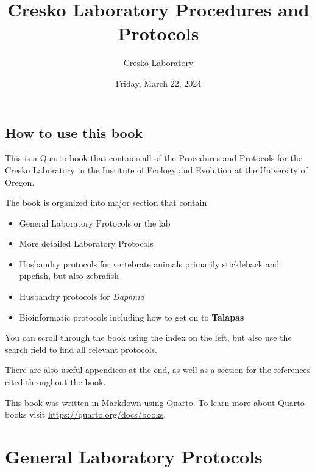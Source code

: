 \documentclass[
  letterpaper,
  DIV=11,
  numbers=noendperiod]{scrreprt}
\title{Cresko Laboratory Procedures and Protocols}
\author{Cresko Laboratory}
\date{Friday, March 22, 2024}
\renewcommand*\contentsname{Table of contents}
\newcommand\contentsname{Table of contents}
\begin{document}
\maketitle
\ifdefined\Shaded\renewenvironment{Shaded}{\begin{tcolorbox}[frame hidden, breakable, boxrule=0pt, interior hidden, sharp corners, enhanced, borderline west={3pt}{0pt}{shadecolor}]}{\end{tcolorbox}}\fi

\renewcommand*\contentsname{Table of contents}
{
\hypersetup{linkcolor=}
\setcounter{tocdepth}{2}
\tableofcontents
}

\hypertarget{how-to-use-this-book}{%
\chapter*{How to use this book}\label{how-to-use-this-book}}


This is a Quarto book that contains all of the Procedures and Protocols
for the Cresko Laboratory in the Institute of Ecology and Evolution at
the University of Oregon.

The book is organized into major section that contain

\begin{itemize}
\item
  General Laboratory Protocols or the lab
\item
  More detailed Laboratory Protocols
\item
  Husbandry protocols for vertebrate animals primarily stickleback and
  pipefish, but also zebrafish
\item
  Husbandry protocols for \emph{Daphnia}
\item
  Bioinformatic protocols including how to get on to \textbf{Talapas}
\end{itemize}

You can scroll through the book using the index on the left, but also
use the search field to find all relevant protocols.

There are also useful appendices at the end, as well as a section for
the references cited throughout the book.

This book was written in Markdown using Quarto. To learn more about
Quarto books visit \url{https://quarto.org/docs/books}.

\part{General Laboratory Protocols}
\end{document}
